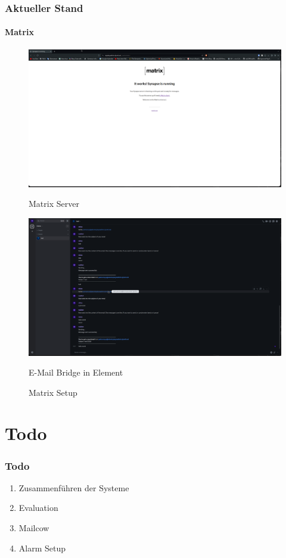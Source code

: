 \documentclass[]{beamer}
\begin{document}
\begin{frame}
	\frametitle{Aktueller Stand}
	\framesubtitle{Matrix}
 \begin{figure}
	\centering
	\begin{minipage}[t]{0.45\textwidth} 
		\centering
		\includegraphics[width=\textwidth]{Images/Matrix_2.png} 
		\caption*{Matrix Server}
	\end{minipage}
	\hfill
	\begin{minipage}[t]{0.45\textwidth} 
		\centering
		\includegraphics[width=\textwidth]{Images/Matrix.png} 
		\caption*{E-Mail Bridge in Element}
	\end{minipage}
	\hfill
	\caption{Matrix Setup}
	\label{fig:Matrix}
\end{figure} 
\end{frame}


\section{Todo}
\begin{frame}
\frametitle{Todo}
\begin{enumerate}
    \item Zusammenführen der Systeme
    \item Evaluation
    \item Mailcow
    \item Alarm Setup
\end{enumerate}
\end{frame}
\end{document}
